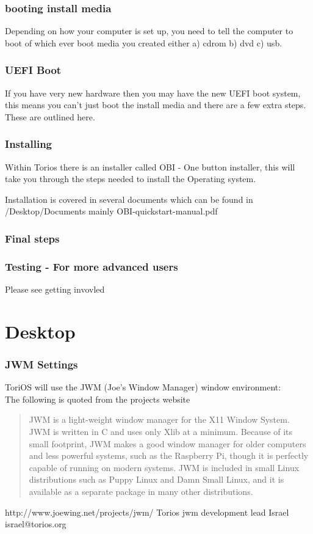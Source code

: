 \documentclass[12pt,a4paper]{book}
\begin{document}
\subsection{booting install media}
Depending on how your computer is set up,  you need to tell the computer to boot of which ever boot media you created either a) cdrom b) dvd c) usb.

\subsection{UEFI Boot}
If you have very new hardware then you may have the new UEFI boot system,  this means you can't just boot the install media and there are a few extra steps.  These are outlined here.
\subsection{Installing}

Within Torios there is an installer called OBI - One button installer,  this will take you through the steps needed to install the Operating system. 

Installation is covered in several documents which can be found in /Desktop/Documents
mainly 
OBI-quickstart-manual.pdf

\subsection{Final steps}

\subsection{Testing - For more advanced users}

Please see getting invovled
 
\chapter{Desktop}

\subsection{JWM Settings}
ToriOS will use the JWM (Joe's Window Manager) window environment:\\

The following is quoted from the projects website

\begin{quote}
JWM is a light-weight window manager for the X11 Window System. JWM is written in C and uses only Xlib at a minimum. Because of its small footprint, JWM makes a good window manager for older computers and less powerful systems, such as the Raspberry Pi, though it is perfectly capable of running on modern systems. JWM is included in small Linux distributions such as Puppy Linux and Damn Small Linux, and it is available as a separate package in many other distributions. 
\end{quote}
http://www.joewing.net/projects/jwm/
Torios jwm development lead Israel israel@torios.org
\newpage
\end{document}
